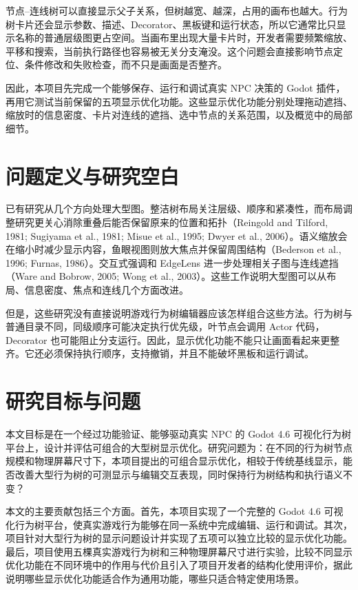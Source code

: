 \documentclass[11pt,a4paper,oneside,extrafontsizes]{memoir}
\begin{document}
节点–连线树可以直接显示父子关系，但树越宽、越深，占用的画布也越大。行为树卡片还会显示参数、描述、Decorator、黑板键和运行状态，所以它通常比只显示名称的普通层级图更占空间。当画布里出现大量卡片时，开发者需要频繁缩放、平移和搜索，当前执行路径也容易被无关分支淹没。这个问题会直接影响节点定位、条件修改和失败检查，而不只是画面是否整齐。

因此，本项目先完成一个能够保存、运行和调试真实 NPC 决策的 Godot 插件，再用它测试当前保留的五项显示优化功能。这些显示优化功能分别处理拖动遮挡、缩放时的信息密度、卡片对连线的遮挡、选中节点的关系范围，以及概览中的局部细节。

\section{问题定义与研究空白}

已有研究从几个方向处理大型图。整洁树布局关注层级、顺序和紧凑性，而布局调整研究更关心消除重叠后能否保留原来的位置和拓扑（Reingold and Tilford, 1981; Sugiyama et al., 1981; Misue et al., 1995; Dwyer et al., 2006）。语义缩放会在缩小时减少显示内容，鱼眼视图则放大焦点并保留周围结构（Bederson et al., 1996; Furnas, 1986）。交互式强调和 EdgeLens 进一步处理相关子图与连线遮挡（Ware and Bobrow, 2005; Wong et al., 2003）。这些工作说明大型图可以从布局、信息密度、焦点和连线几个方面改进。

但是，这些研究没有直接说明游戏行为树编辑器应该怎样组合这些方法。行为树与普通目录不同，同级顺序可能决定执行优先级，叶节点会调用 Actor 代码，Decorator 也可能阻止分支运行。因此，显示优化功能不能只让画面看起来更整齐。它还必须保持执行顺序，支持撤销，并且不能破坏黑板和运行调试。

\section{研究目标与问题}

本文目标是在一个经过功能验证、能够驱动真实 NPC 的 Godot 4.6 可视化行为树平台上，设计并评估可组合的大型树显示优化。研究问题为：在不同的行为树节点规模和物理屏幕尺寸下，本项目提出的可组合显示优化，相较于传统基线显示，能否改善大型行为树的可测显示与编辑交互表现，同时保持行为树结构和执行语义不变？

本文的主要贡献包括三个方面。首先，本项目实现了一个完整的 Godot 4.6 可视化行为树平台，使真实游戏行为能够在同一系统中完成编辑、运行和调试。其次，项目针对大型行为树的显示问题设计并实现了五项可以独立比较的显示优化功能。最后，项目使用五棵真实游戏行为树和三种物理屏幕尺寸进行实验，比较不同显示优化功能在不同环境中的作用与代价且引入了项目开发者的结构化使用评价，据此说明哪些显示优化功能适合作为通用功能，哪些只适合特定使用场景。
\end{document}
